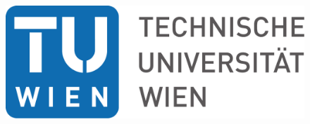 \begin{titlepage}
	\begin{figure}[h]
		\flushleft
		\includegraphics[scale=0.24]{figures/TU_Wien_Logo.pdf}
	\end{figure}


\end{titlepage}
